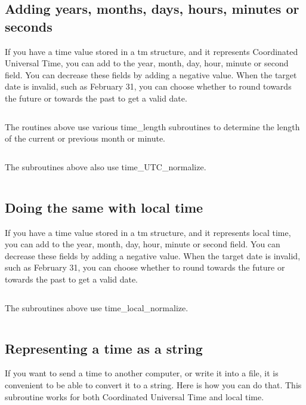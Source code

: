 \documentclass[letterpaper,twoside]{article}
\begin{document}
\subsection{Adding years, months, days, hours, minutes or seconds}
\label{subsection:timeUTCadd}
If you have a time value stored in a {\ttfamily tm} structure, and it represents
Coordinated Universal Time, you can add to the year, month, day, hour,
minute or second field.  You can decrease these fields by adding a
negative value.  When the target date is invalid, such as February 31,
you can choose whether to round towards the future or towards the past
to get a valid date.
\inputminted[firstline=32]{c}{src/time_utc_add.c}
The routines above use various time\_length subroutines to determine
the length of the current or previous month or minute.
\inputminted[firstline=32]{c}{src/time_length.c}

The subroutines above also use time\_UTC\_normalize.
\inputminted[firstline=32]{c}{src/time_utc_normalize.c}

\subsection{Doing the same with local time}
\label{subsection:timelocaladd}
If you have a time value stored in a {\ttfamily tm} structure, and it represents
local time, you can add to the year, month, day, hour, minute or
second field.  You can decrease these fields by adding a negative
value.  When the target date is invalid, such as February 31,
you can choose whether to round towards the future or towards the past
to get a valid date.
\inputminted[firstline=32]{c}{src/time_local_add.c}
The subroutines above use time\_local\_normalize.
\inputminted[firstline=32]{c}{src/time_local_normalize.c}

\subsection{Representing a time as a string}
\label{subsection:tostring}
If you want to send a time to another computer, or write it into a file,
it is convenient to be able to convert it to a string.  Here is how you
can do that.  This subroutine works for both Coordinated Universal Time
and local time.
\inputminted[firstline=34]{c}{src/time_tm_to_string.c}
\end{document}
